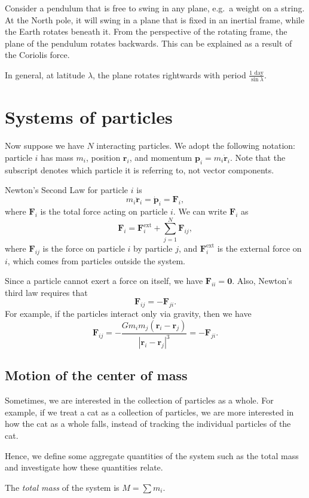 \documentclass[a4paper]{article}
\begin{document}
\begin{eg}
  Consider a pendulum that is free to swing in any plane, e.g.\ a weight on a string. At the North pole, it will swing in a plane that is fixed in an inertial frame, while the Earth rotates beneath it. From the perspective of the rotating frame, the plane of the pendulum rotates backwards. This can be explained as a result of the Coriolis force.

  In general, at latitude $\lambda$, the plane rotates rightwards with period $\frac{1\text{ day}}{\sin \lambda}$.
\end{eg}

\section{Systems of particles}
Now suppose we have $N$ interacting particles. We adopt the following notation: particle $i$ has mass $m_i$, position $\mathbf{r}_i$, and momentum $\mathbf{p}_i = m_i \dot{\mathbf{r}}_i$. Note that the subscript denotes which particle it is referring to, not vector components.

Newton's Second Law for particle $i$ is
\[
  m_i \ddot{\mathbf{r}}_i = \dot{\mathbf{p}}_i = \mathbf{F}_i,
\]
where $\mathbf{F}_i$ is the total force acting on particle $i$. We can write $\mathbf{F}_i$ as
\[
  \mathbf{F}_i = \mathbf{F}_i^{\text{ext}} + \sum_{j = 1}^N \mathbf{F}_{ij},
\]
where $\mathbf{F}_{ij}$ is the force on particle $i$ by particle $j$, and $\mathbf{F}_i^{\text{ext}}$ is the external force on $i$, which comes from particles outside the system.

Since a particle cannot exert a force on itself, we have $\mathbf{F}_{ii} = \mathbf{0}$. Also, Newton's third law requires that
\[
  \mathbf{F}_{ij} = -\mathbf{F}_{ji}.
\]
For example, if the particles interact only via gravity, then we have
\[
  \mathbf{F}_{ij} = -\frac{Gm_im_j(\mathbf{r}_i - \mathbf{r}_j)}{|\mathbf{r}_i - \mathbf{r}_j|^3} = -\mathbf{F}_{ji}.
\]
\subsection{Motion of the center of mass}
Sometimes, we are interested in the collection of particles as a whole. For example, if we treat a cat as a collection of particles, we are more interested in how the cat as a whole falls, instead of tracking the individual particles of the cat.

Hence, we define some aggregate quantities of the system such as the total mass and investigate how these quantities relate.
\begin{defi}
  The \emph{total mass} of the system is $M = \sum m_i$.
\end{defi}
\end{document}
